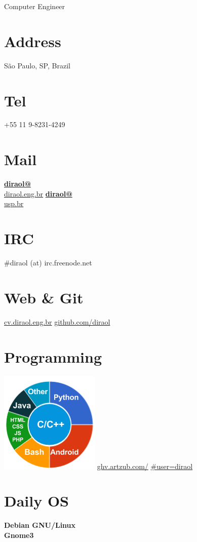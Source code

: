 \documentclass[]{friggeri-cv}
\begin{document}
      {Computer Engineer}
      

\begin{aside}
  \section{Address}
    São Paulo, SP, Brazil
    ~
  \section{Tel}
    +55 11 9-8231-4249
    ~
  \section{Mail}
    \href{mailto:diraol@diraol.eng.br}{\textbf{diraol@}\\diraol.eng.br}
    \href{mailto:diraol@usp.br}{\textbf{diraol@}\\usp.br}
    ~
  \section{IRC}
    \#diraol (at) irc.freenode.net
    ~
  \section{Web \& Git}
    \href{http://cv.diraol.eng.br}{cv.diraol.eng.br}
    \href{https://github.com/diraol}{github.com/diraol}
    ~
  \section{Programming}
    \includegraphics[scale=0.62]{img/programming.png}
    \href{http://ghv.artzub.com/\#user=diraol}{ghv.artzub.com/}
    \href{http://ghv.artzub.com/\#user=diraol}{\#user=diraol}
    ~
  \section{Daily OS}
    \textbf{Debian GNU/Linux}\\%
    \textbf{Gnome3}%
    ~
\end{aside}
\end{document}
